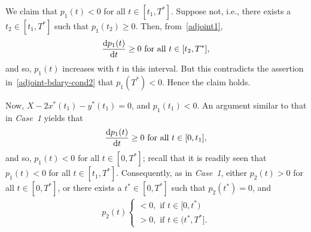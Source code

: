 \documentclass[10pt,journal,letterpaper]{IEEEtran}
\newcommand{\remove}[1]{}
\begin{document}
\begin{IEEEproof}
We claim that $p_1(t) < 0$  for all $t \in [t_1, T^{\ast}]$. 
Suppose not, i.e., there exists a $t_2 \in [t_1,T^{\ast}]$ such that
$p_1(t_2) \geq 0$. Then, from~\eqref{adjoint1},
\[ 
\frac{{\rm d}p_1(t)}{{\rm d}t} \geq 0 \mbox{ for all } t \in [t_2,T^{\ast}],
\]
and so, $p_1(t)$ increases with $t$ in this interval. But this
contradicts the assertion in~\eqref{adjoint-bdary-cond2} that
$p_1(T^{\ast}) < 0$. Hence the claim holds.

Now, $X - 2x^{\ast}(t_1) - y^{\ast}(t_1) =0$, and $p_1(t_1) < 0$.
An argument similar to that in {\it Case~1} yields that 
\[
\frac{{\rm d}p_1(t)}{{\rm d}t} \geq 0 \mbox{ for all } t \in [0,t_1],
\]
and so, $p_1(t) < 0$ for all $t \in [0,T^{\ast}]$; 
recall that it is readily seen that $p_1(t) < 0$  for all $t \in [t_1, T^{\ast}]$.  
Consequently, as in {\it Case~1},
either $p_2(t) > 0$ for all $t \in [0,T^{\ast}]$, 
or there exists a $t^{\ast} \in [0, T^{\ast}]$ such that $p_2(t^{\ast}) = 0$, and 
\begin{align*}
p_2(t) \left\{ \begin{array}{ll}
                 < 0, \mbox{ if } t \in [0, t^{\ast})\\
                 > 0, \mbox{ if } t \in (t^{\ast},T^{\ast}].\end{array} \right.
\end{align*}

\remove{
$p_1(t) \leq p_1(t_1)$ for all $t \in [0, t_1]$. Our assertion
for $t $conclusion implies that~(see~\eqref{adjoint2})
\[
\frac{{\rm d}p_2(t)}{{\rm d}t} > 0 \mbox{ for all } t \in
[t_1,T^{\ast}],
\]
and so, $p_2(t)$ is increasing in $[t_1,T^{\ast}]$. Since
$p_2(T^{\ast}) = \Gamma >0$, either there exists a $t^{\ast} \in
[t_1, T^{\ast}]$ such that $p_2(t^{\ast}) = 0$ and
\begin{align*}
p_2(t) \left\{ \begin{array}{ll}
                 < 0, \mbox{ if } t \in [t_1,t^{\ast})\\
                 > 0, \mbox{ if } t \in (t^{\ast},T^{\ast}],\end{array} \right.
\end{align*}
or $p_2(t) > 0$ for all $t \in [t_1,T^{\ast}]$. In the former case,

\[
\frac{{\rm d}p_2(t)}{{\rm d}t} > 0.
\]
for all  $t \in [0,t_1]$, further implying that $p_2(t) < 0$ for all
$t \in [0,t_1]$. In the latter case, $X - 2x^{\ast}(t_1) -
y^{\ast}(t_1) =0 $. We also have $p_1(t_1) < 0$ and $p_2(t_1) > 0$.
But this is similar to {\it Case~1}, whence we conclude that either
$p_2(t) > 0$ for all $t \in [0,t_1]$, or there exists a $t^{\ast}
\in [0, t_1)$ such that
\begin{align*}
p_2(t) \left\{ \begin{array}{ll}
                 < 0, \mbox{ if } t \in [0, t^{\ast})\\
                 > 0, \mbox{ if } t \in (t^{\ast},t_1].\end{array} \right.
\end{align*}
}


\end{IEEEproof}
\end{document}
